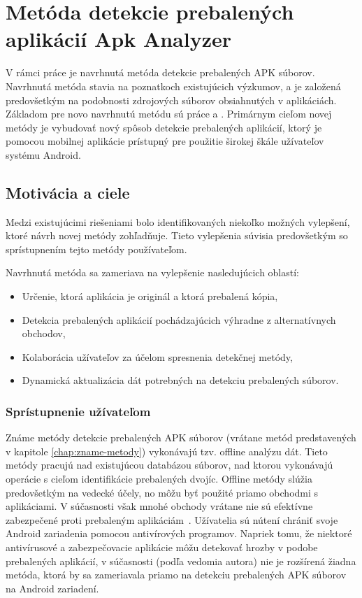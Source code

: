 \chapter{Metóda detekcie prebalených aplikácií Apk Analyzer}
\label{chap:metoda-detekcie-apk-analyzer}
V rámci práce je navrhnutá metóda detekcie prebalených APK súborov. Navrhnutá metóda stavia na poznatkoch existujúcich výzkumov, a je založená predovšetkým na podobnosti zdrojových súborov obsiahnutých v aplikáciách. Základom pre novo navrhnutú metódu sú práce  a . Primárnym cieľom novej metódy je vybudovať nový spôsob detekcie prebalených aplikácií, ktorý je pomocou mobilnej aplikácie prístupný pre použitie širokej škále užívateľov systému Android.

\section{Motivácia a ciele}

Medzi existujúcimi riešeniami bolo identifikovaných niekoľko možných vylepšení, ktoré návrh novej metódy zohľadňuje. Tieto vylepšenia súvisia predovšetkým so sprístupnením tejto metódy používateľom. 

\noindent Navrhnutá metóda sa zameriava na vylepšenie nasledujúcich oblastí:
\begin{itemize}
	\item Určenie, ktorá aplikácia je originál a ktorá prebalená kópia,
	\item Detekcia prebalených aplikácií pochádzajúcich výhradne z alternatívnych obchodov,
	\item Kolaborácia užívateľov za účelom spresnenia detekčnej metódy,
	\item Dynamická aktualizácia dát potrebných na detekciu prebalených súborov.
\end{itemize}

\subsection*{Sprístupnenie užívateľom}

Známe metódy detekcie prebalených APK súborov (vrátane metód predstavených v kapitole \ref{chap:zname-metody}) vykonávajú tzv. offline analýzu dát. Tieto metódy pracujú nad existujúcou databázou súborov, nad ktorou vykonávajú operácie s cieľom identifikácie prebalených dvojíc. Offline metódy slúžia predovšetkým na vedecké účely, no môžu byť použité priamo obchodmi s aplikáciami. V súčasnosti však mnohé obchody vrátane  nie sú efektívne zabezpečené proti prebaleným aplikáciám~\cite{Zhauniarovich2013}. Užívatelia sú nútení chrániť svoje Android zariadenia pomocou antivírových programov. Napriek tomu, že niektoré antivírusové a zabezpečovacie aplikácie môžu detekovať hrozby v podobe prebalených aplikácií, v súčasnosti (podľa vedomia autora) nie je rozšírená žiadna metóda, ktorá by sa zameriavala priamo na detekciu prebalených APK súborov  na Android zariadení.

